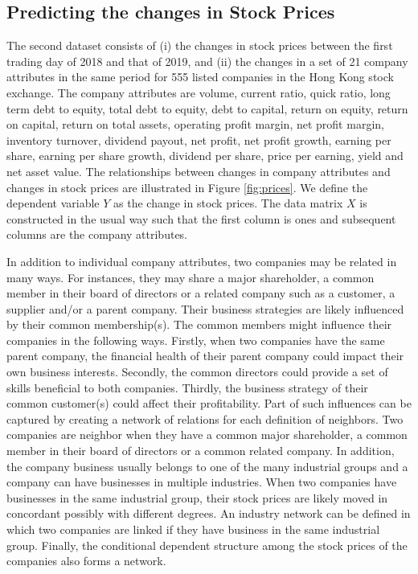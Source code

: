 \documentclass[times, doublespace]{auth}
\begin{document}
\subsection{Predicting the changes in Stock Prices}
The second dataset consists of (i) the changes in stock prices between the first trading day of 2018 and that of 2019, and (ii) the changes in a set of 21 company attributes in the same period for 555 listed companies in the Hong Kong stock exchange. The company attributes are volume, current ratio, quick ratio, long term debt to equity, total debt to equity, debt to capital, return on equity, return on capital, return on total assets, operating profit margin, net profit margin, inventory turnover, dividend payout, net profit, net profit growth, earning per share, earning per share growth, dividend per share, price per earning, yield and net asset value. The relationships between changes in company attributes and changes in stock prices are illustrated in Figure \ref{fig:prices}. We define the dependent variable $Y$ as the change in stock prices. The data matrix $X$ is constructed in the usual way such that the first column is ones and subsequent columns are the company attributes. 
\newline

In addition to individual company attributes, two companies may be related in many ways. For instances, they may share a major shareholder, a common member in their board of directors or a related company such as a customer, a supplier and/or a parent company. Their business strategies are likely influenced by their common membership(s). The common members might influence their companies in the following ways. Firstly, when two companies have the same parent company, the financial health of their parent company could impact their own business interests. Secondly, the common directors could provide a set of skills beneficial to both companies. Thirdly, the business strategy of their common customer(s) could affect their profitability. Part of such influences can be captured by creating a network of relations for each definition of neighbors. Two companies are neighbor when they have a common major shareholder, a common member in their board of directors or a common related company. In addition, the company business usually belongs to one of the many industrial groups and a company can have businesses in multiple industries. When two companies have businesses in the same industrial group, their stock prices are likely moved in concordant possibly with different degrees. An industry network can be defined in which two companies are linked if they have business in the same industrial group. Finally, the conditional dependent structure among the stock prices of the companies also forms a network. 
\newline
\end{document}
